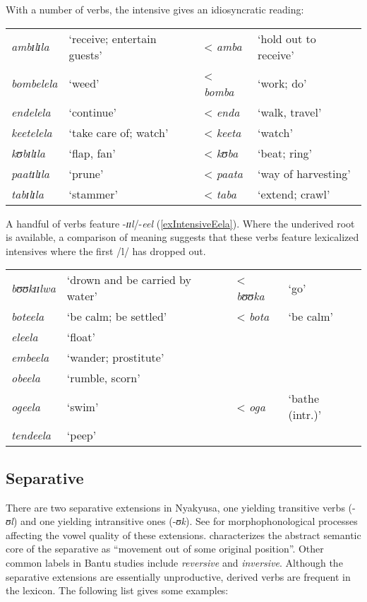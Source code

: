 With a number of verbs, the intensive gives an idiosyncratic reading:
\begin{exe}
\ex\label{exIntensiveIdeosyncratic}
\begin{tabular}[t]{@{}llll}
\textit{ambɪlɪla}&`receive; entertain guests'& < \textit{amba}&`hold out to receive'\\ 
\textit{bombelela}&`weed'& < \textit{bomba}&`work; do'\\  
\textit{endelela}&\lq continue'& < \textit{enda} & \lq walk, travel'\\%
\textit{keetelela}&`take care of; watch'& < \textit{keeta}&`watch'\\
\textit{kʊbɪlɪla}&\lq flap, fan' & < \textit{kʊba}& \lq beat; ring'\\
\textit{paatɪlɪla}&\lq prune' & < \textit{paata}&\lq way of harvesting'\\
\textit{tabɪlɪla}&\lq stammer' & < \textit{taba}&\lq extend; crawl'
\end{tabular}
\end{exe}

A handful of verbs feature -\textit{ɪɪl}/-\textit{eel} (\ref{exIntensiveEela}). Where the underived root is available, a comparison of meaning suggests that these verbs feature lexicalized intensives where the first /l/ has dropped out.
\begin{exe}
\ex\label{exIntensiveEela}\begin{tabular}[t]{llll} 
\textit{bʊʊkɪɪlwa}&\lq drown and be carried by water' & < \textit{bʊʊka}&\lq go'\\
\textit{boteela}&`be calm; be settled'& < \textit{bota}&`be calm'\\
\textit{eleela}&`float'&&\\
\textit{embeela}&`wander; prostitute'&&\\
\textit{obeela}&`rumble, scorn'&&\\
\textit{ogeela}&`swim'& < \textit{oga}&`bathe (intr.)'\\
\textit{tendeela}&`peep'&&\\
\end{tabular}
\end{exe}
\subsection{Separative}\label{Separative}
There are two separative extensions in Nyakyusa, one yielding transitive verbs (-\textit{ʊl}) and one yielding intransitive ones (-\textit{ʊk}). See  for morphophonological processes affecting the vowel quality of these extensions. \citet[78]{SchadebergT2003a} characterizes the abstract semantic core of the separative as ``movement out of some original position''. Other common labels in Bantu studies include \textit{reversive} and \textit{inversive}. Although the separative extensions are essentially unproductive, derived verbs are frequent in the lexicon. The following list gives some examples:

